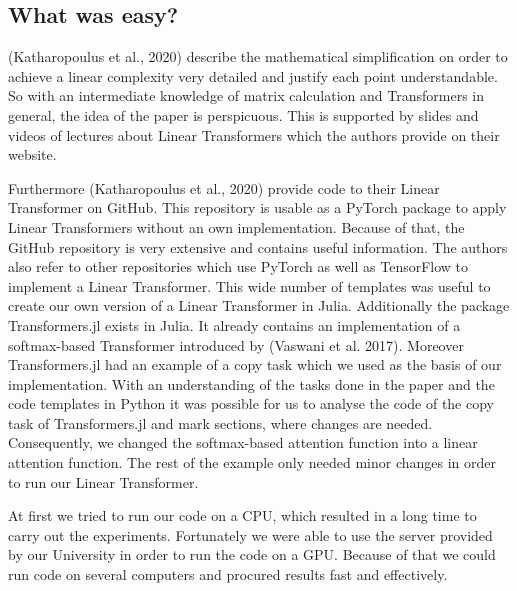 \documentclass[DIV=13,fontsize=11pt]{scrartcl}
\begin{document}
\subsection{What was easy?}
(Katharopoulus et al., 2020) describe the mathematical simplification on order to achieve a linear complexity very detailed and justify each point understandable. So with an intermediate knowledge of matrix calculation and Transformers in general, the idea of the paper is perspicuous. This is supported by slides and videos of lectures about Linear Transformers which the authors provide on their website. 

Furthermore (Katharopoulus et al., 2020) provide code to their Linear Transformer on GitHub. This repository is usable as a PyTorch package to apply Linear Transformers without an own implementation. Because of that, the GitHub repository is very extensive and contains useful information. The authors also refer to other repositories which use PyTorch as well as TensorFlow to implement a Linear Transformer. This wide number of templates was useful to create our own version of a Linear Transformer in Julia. Additionally the package Transformers.jl exists in Julia. It already contains an implementation of a softmax-based Transformer introduced by (Vaswani et al. 2017). Moreover Transformers.jl had an example of a copy task which we used as the basis of our implementation. With an understanding of the tasks done in the paper and the code templates in Python it was possible for us to analyse the code of the copy task of Transformers.jl and mark sections, where changes are needed. Consequently, we changed the softmax-based attention function into a linear attention function. The rest of the example only needed minor changes in order to run our Linear Transformer.

At first we tried to run our code on a CPU, which resulted in a long time to carry out the experiments. Fortunately we were able to use the server provided by our University in order to run the code on a GPU. Because of that we could run code on several computers and procured results fast and effectively. 


\end{document}
